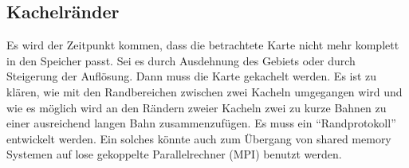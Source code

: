 \documentclass[
11pt, %
a4paper, %
oneside, %
pdfspacing, %
headinclude,
BCOR5mm, %
ngerman, %
bibtotocnumbered,
]{scrartcl}
\begin{document}
%
%
%
%


\subsection{Kachelränder}
Es wird der Zeitpunkt kommen, dass die betrachtete Karte nicht mehr komplett in den Speicher passt. Sei es durch Ausdehnung des Gebiets oder durch Steigerung der Auflösung. Dann muss die Karte gekachelt werden. Es ist zu klären, wie mit den Randbereichen zwischen zwei Kacheln umgegangen wird und wie es möglich wird an den Rändern zweier Kacheln zwei zu kurze Bahnen zu einer ausreichend langen Bahn zusammenzufügen. Es muss ein "`Randprotokoll"' entwickelt werden. Ein solches könnte auch zum Übergang von shared memory Systemen auf lose gekoppelte Parallelrechner (MPI) benutzt werden.
\end{document}
